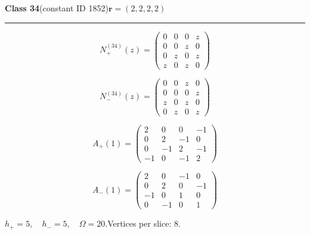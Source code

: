\noindent\begin{minipage}{\linewidth}
\noindent\textbf{Class 34}\quad\small (constant ID 1852)\hfill $\symbf{r}=(2,2,2,2)$
\par\smallskip\noindent\textcolor{rulegray}{\rule{\linewidth}{0.3pt}}
\begin{minipage}[c]{0.495\linewidth}\centering\fontsize{9.7}{12}\selectfont
\setlength{\abovedisplayskip}{4pt}\setlength{\belowdisplayskip}{4pt}
\setlength{\abovedisplayshortskip}{4pt}\setlength{\belowdisplayshortskip}{4pt}
\setlength{\arraycolsep}{3pt}\renewcommand{\arraystretch}{1.08}
\[N_{+}^{(34)}(z)=\begin{pmatrix}0 & 0 & 0 & z\\0 & 0 & z & 0\\0 & z & 0 & z\\z & 0 & z & 0\end{pmatrix}\]
\end{minipage}%
\begin{minipage}[c]{0.495\linewidth}\centering\fontsize{9.7}{12}\selectfont
\setlength{\abovedisplayskip}{4pt}\setlength{\belowdisplayskip}{4pt}
\setlength{\abovedisplayshortskip}{4pt}\setlength{\belowdisplayshortskip}{4pt}
\setlength{\arraycolsep}{3pt}\renewcommand{\arraystretch}{1.08}
\[N_{-}^{(34)}(z)=\begin{pmatrix}0 & 0 & z & 0\\0 & 0 & 0 & z\\z & 0 & z & 0\\0 & z & 0 & z\end{pmatrix}\]
\end{minipage}%
\par\noindent
\begin{minipage}[c]{0.495\linewidth}\centering\fontsize{9.7}{12}\selectfont
\setlength{\abovedisplayskip}{4pt}\setlength{\belowdisplayskip}{4pt}
\setlength{\abovedisplayshortskip}{4pt}\setlength{\belowdisplayshortskip}{4pt}
\setlength{\arraycolsep}{3pt}\renewcommand{\arraystretch}{1.08}
\[A_{+}(1)=\begin{pmatrix}2 & 0 & 0 & -1\\0 & 2 & -1 & 0\\0 & -1 & 2 & -1\\-1 & 0 & -1 & 2\end{pmatrix}\]
\end{minipage}%
\begin{minipage}[c]{0.495\linewidth}\centering\fontsize{9.7}{12}\selectfont
\setlength{\abovedisplayskip}{4pt}\setlength{\belowdisplayskip}{4pt}
\setlength{\abovedisplayshortskip}{4pt}\setlength{\belowdisplayshortskip}{4pt}
\setlength{\arraycolsep}{3pt}\renewcommand{\arraystretch}{1.08}
\[A_{-}(1)=\begin{pmatrix}2 & 0 & -1 & 0\\0 & 2 & 0 & -1\\-1 & 0 & 1 & 0\\0 & -1 & 0 & 1\end{pmatrix}\]
\end{minipage}%
\par\smallskip\noindent\small $h_+=5,\quad h_-=5,\quad \Omega=20.$\quad Vertices per slice: 8.
\end{minipage}\par\vfill
